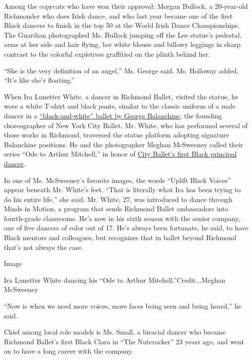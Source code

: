 Among the copycats who have won their approval: Morgan Bullock, a
20-year-old Richmonder who does Irish dance, and who last year became
one of the first Black dancers to finish in the top 50 at the World
Irish Dance Championships. The Guardian photographed Ms. Bullock jumping
off the Lee statue's pedestal, arms at her side and hair flying, her
white blouse and billowy leggings in sharp contrast to the colorful
expletives graffitied on the plinth behind her.

``She is the very definition of an angel,'' Ms. George said. Ms.
Holloway added, ``It's like she's floating.''

When Ira Lunetter White, a dancer in Richmond Ballet, visited the
statue, he wore a white T-shirt and black pants, similar to the classic
uniform of a male dancer in a
\href{https://www.nytimes.com/2013/09/26/arts/design/new-york-city-ballets-balanchine-black-and-white.html}{``black-and-white''
ballet by George Balanchine}, the founding choreographer of New York
City Ballet. Mr. White, who has performed several of those works in
Richmond, traversed the statue platform adopting signature Balanchine
positions. He and the photographer Meghan McSweeney called their series
``Ode to Arthur Mitchell,'' in honor of
\href{https://www.nytimes.com/2013/09/26/arts/design/new-york-city-ballets-balanchine-black-and-white.html}{City
Ballet's first Black principal dancer}.

In one of Ms. McSweeney's favorite images, the words ``Uplift Black
Voices'' appear beneath Mr. White's feet. ``That is literally what Ira
has been trying to do his entire life,'' she said. Mr. White, 27, was
introduced to dance through Minds in Motion, a program that sends
Richmond Ballet ambassadors into fourth-grade classrooms. He's now in
his sixth season with the senior company, one of five dancers of color
out of 17. He's always been fortunate, he said, to have Black mentors
and colleagues, but recognizes that in ballet beyond Richmond that's not
always the case.

Image

Ira Lunetter White dancing his ``Ode to Arthur
Mitchell.''Credit...Meghan McSweeney

``Now is when we need more voices, more faces being seen and being
heard,'' he said.

Chief among local role models is Ms. Small, a biracial dancer who became
Richmond Ballet's first Black Clara in ``The Nutcracker'' 23 years ago,
and went on to have a long career with the company.

